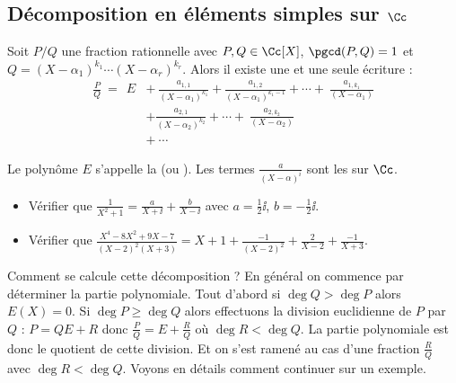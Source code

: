 \documentclass[class=report,crop=false]{standalone}
\begin{document}
\subsection{Décomposition en éléments simples sur $\Cc$}


\begin{theoreme}
Soit $P/Q$ une fraction rationnelle avec $P,Q \in \Cc[X]$, $\pgcd(P,Q)=1$ et
$Q=(X-\alpha_1)^{k_1}\cdots(X-\alpha_r)^{k_r}$.
Alors il existe une et une seule écriture :
$$\begin{array}{rl}
\displaystyle \frac{P}{Q} \  =  \ \  E  & + \
 \displaystyle  \frac{a_{1,1}}{(X-\alpha_1)^{k_1}}+\frac{a_{1,2}}{(X-\alpha_1)^{k_1-1}}+\cdots
+\ \frac{a_{1,k_1}}{(X-\alpha_1)} \\[4mm]
  & \displaystyle+ \frac{a_{2,1}}{(X-\alpha_2)^{k_2}}+\cdots
+\ \frac{a_{2,k_2}}{(X-\alpha_2)} \\[3mm]
 & + \ \cdots
\end{array}$$
\end{theoreme}

Le polynôme $E$ s'appelle la  
(ou \defi{partie entière}).
Les termes $\frac{a}{(X-\alpha)^i}$ sont les  sur $\Cc$.


\begin{exemple}
\sauteligne
\begin{itemize}
  \item Vérifier que $\frac{1}{X^2+1} = \frac{a}{X+\ii} + \frac{b}{X-\ii}$ avec $a=\frac12 \ii$, $b=-\frac12\ii$.
  \item Vérifier que  $\frac{X^4-8X^2+9X-7}{(X-2)^2(X+3)}= X+1 + \frac{-1}{(X-2)^2} + \frac{2}{X-2} + \frac{-1}{X+3}$.
\end{itemize}
\end{exemple}


Comment se calcule cette décomposition ?
En général on commence par déterminer la partie polynomiale.
Tout d'abord si $\deg Q > \deg P$ alors $E(X)=0$.
Si $\deg P \ge \deg Q$ alors effectuons la division euclidienne de $P$ par $Q$ :
$P=QE+R$ donc $\frac{P}{Q} = E + \frac{R}{Q}$
où $\deg R < \deg Q$.
La partie polynomiale est donc le quotient de cette division.
Et on s'est ramené au cas d'une fraction $\frac{R}{Q}$ avec $\deg R < \deg Q$.
Voyons en détails comment continuer sur un exemple.
\end{document}
